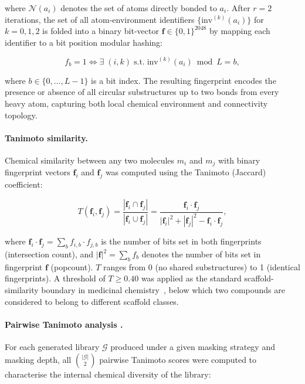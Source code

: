 \documentclass[a4paper,12pt]{article}
\begin{document}
\noindent where $\mathcal{N}(a_i)$ denotes the set of atoms
directly bonded to $a_i$.
After $r = 2$ iterations, the set of all atom-environment
identifiers $\{\text{inv}^{(k)}(a_i)\}$ for $k = 0, 1, 2$ is
folded into a binary bit-vector $\mathbf{f} \in \{0,1\}^{2048}$
by mapping each identifier to a bit position  modular hashing:
 
\begin{equation}
    f_b = 1 \iff \exists\; (i, k) \;\text{s.t.}\;
          \text{inv}^{(k)}(a_i) \bmod L = b,
    \label{eq:morgan_fold}
\end{equation}
 
\noindent where $b \in \{0, \ldots, L-1\}$ is a bit index.
The resulting fingerprint encodes the presence or absence of all
circular substructures up to two bonds from every heavy atom,
capturing both local chemical environment and connectivity topology.
 
\paragraph{Tanimoto similarity.}
Chemical similarity between any two molecules $m_i$ and $m_j$
with binary fingerprint vectors $\mathbf{f}_i$ and $\mathbf{f}_j$
was computed using the Tanimoto (Jaccard) coefficient:
 
\begin{equation}
    T(\mathbf{f}_i, \mathbf{f}_j)
    = \frac{|\mathbf{f}_i \cap \mathbf{f}_j|}
           {|\mathbf{f}_i \cup \mathbf{f}_j|}
    = \frac{\mathbf{f}_i \cdot \mathbf{f}_j}
           {|\mathbf{f}_i|^2 + |\mathbf{f}_j|^2
            - \mathbf{f}_i \cdot \mathbf{f}_j},
    \label{eq:tanimoto}
\end{equation}
 
\noindent where $\mathbf{f}_i \cdot \mathbf{f}_j = \sum_b f_{i,b}
\cdot f_{j,b}$ is the number of bits set in both fingerprints
(intersection count), and $|\mathbf{f}|^2 = \sum_b f_b$ denotes
the number of bits set in fingerprint $\mathbf{f}$ (popcount).
$T$ ranges from 0 (no shared substructures) to 1 (identical
fingerprints).
A threshold of $T \geq 0.40$ was applied as the standard
scaffold-similarity boundary in medicinal chemistry~\cite{maggiora2014},
below which two compounds are considered to belong to different
scaffold classes.
 
\paragraph{Pairwise Tanimoto analysis .}
For each generated library $\mathcal{G}$ produced under a given
masking strategy and masking depth, all $\binom{|\mathcal{G}|}{2}$
pairwise Tanimoto scores were computed to characterise the internal
chemical diversity of the library:
 
\end{document}
